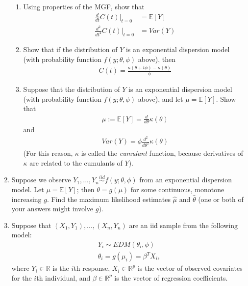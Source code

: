 \documentclass[11pt]{article}
\begin{document}
\begin{enumerate}
\begin{enumerate}
\item Using properties of the MGF, show that 
\begin{align*}
\frac{d}{dt} C(t) \biggr\rvert_{t=0} &= \mathbb{E}[Y] \\
\frac{d^2}{dt^2} C(t) \biggr\rvert_{t=0} &= Var(Y)
\end{align*}

\item Show that if the distribution of $Y$ is an exponential dispersion model (with probability function $f(y; \theta, \phi)$ above), then
\begin{align*}
C(t) = \frac{\kappa(\theta + t\phi) - \kappa(\theta)}{\phi}
\end{align*}

\item Suppose that the distribution of $Y$ is an exponential dispersion model (with probability function $f(y; \theta, \phi)$ above), and let $\mu = \mathbb{E}[Y]$. Show that
\begin{align*}
\mu := \mathbb{E}[Y] = \frac{d}{d\theta} \kappa(\theta)
\end{align*}
and
\begin{align*}
Var(Y) = \phi \frac{d^2}{d \theta^2} \kappa(\theta)
\end{align*}
(For this reason, $\kappa$ is called the \textit{cumulant} function, because derivatives of $\kappa$ are related to the cumulants of $Y$).

\end{enumerate}

\item Suppose we observe $Y_1,...,Y_n \overset{iid}{\sim} f(y; \theta, \phi)$ from an exponential dispersion model.  Let $\mu = \mathbb{E}[Y]$; then $\theta = g(\mu)$ for some continuous, monotone increasing $g$. Find the maximum likelihood estimates $\widehat{\mu}$ and $\widehat{\theta}$ (one or both of your answers might involve $g$).

\item Suppose that $(X_1, Y_1),...,(X_n, Y_n)$ are an iid sample from the following model:
\begin{align*}
Y_i \sim EDM(\theta_i, \phi) \\
\theta_i = g(\mu_i) = \beta^T X_i,
\end{align*}
where $Y_i \in \mathbb{R}$ is the $i$th response, $X_i \in \mathbb{R}^p$ is the vector of observed covariates for the $i$th individual, and $\beta \in \mathbb{R}^p$ is the vector of regression coefficients.\\


\end{enumerate}
\end{document}
